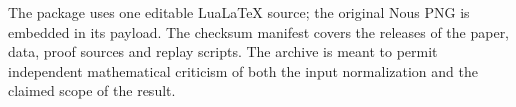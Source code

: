 \documentclass[12pt,letterpaper]{article}
\begin{document}
The package uses one editable LuaLaTeX source; the original Nous PNG is embedded in its payload. The checksum manifest covers the releases of the paper, data, proof sources and replay scripts. The archive is meant to permit independent mathematical criticism of both the input normalization and the claimed scope of the result.
\end{document}
